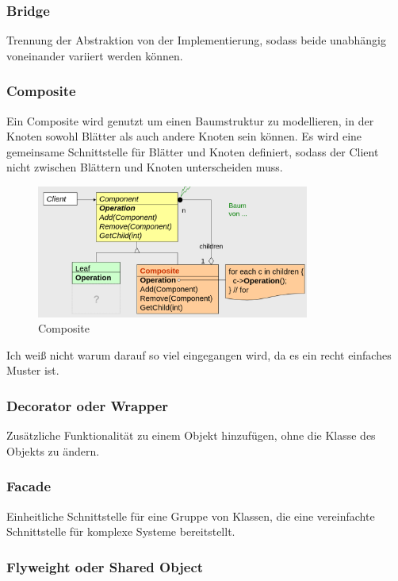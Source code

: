 \documentclass[12pt]{scrartcl}
\begin{document}
\subsubsection{Bridge}

Trennung der Abstraktion von der Implementierung, sodass beide unabhängig voneinander variiert werden können.

\subsubsection{Composite}

Ein Composite wird genutzt um einen Baumstruktur zu modellieren, in der Knoten sowohl Blätter als auch andere Knoten sein können.
Es wird eine gemeinsame Schnittstelle für Blätter und Knoten definiert, sodass der Client nicht zwischen Blättern und Knoten unterscheiden muss.

\begin{figure}[H]
	\centering
	\includegraphics[width=0.8\textwidth]{images/muster_6.png}
	\caption{Composite}
\end{figure}

Ich weiß nicht warum darauf so viel eingegangen wird, da es ein recht einfaches Muster ist.

\subsubsection{Decorator oder Wrapper}

Zusätzliche Funktionalität zu einem Objekt hinzufügen, ohne die Klasse des Objekts zu ändern.

\subsubsection{Facade}

Einheitliche Schnittstelle für eine Gruppe von Klassen, die eine vereinfachte Schnittstelle für komplexe Systeme bereitstellt.

\subsubsection{Flyweight oder Shared Object}
\end{document}
